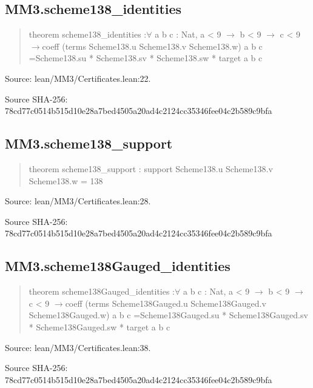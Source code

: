 \documentclass[11pt,a4paper]{article}
\begin{document}
\begin{samepage}
\subsection{MM3.scheme138\_identities}
\begin{quote}\small\ttfamily theorem scheme138\_identities :\newline     \ensuremath{\forall} a b c : Nat, a < 9 \ensuremath{\to} b < 9 \ensuremath{\to} c < 9 \ensuremath{\to}\newline       coeff (terms Scheme138.u Scheme138.v Scheme138.w) a b c =\newline         Scheme138.su * Scheme138.sv * Scheme138.sw * target a b c\end{quote}
{\small Source: lean/MM3/Certificates.lean:22.\par}

{\small Source SHA-256: 78cd77c0514b515d10e28a7bed4505a20ad4c2124cc35346fee04c2b589c9bfa\par}

\end{samepage}
\begin{samepage}
\subsection{MM3.scheme138\_support}
\begin{quote}\small\ttfamily theorem scheme138\_support : support Scheme138.u Scheme138.v Scheme138.w = 138\end{quote}
{\small Source: lean/MM3/Certificates.lean:28.\par}

{\small Source SHA-256: 78cd77c0514b515d10e28a7bed4505a20ad4c2124cc35346fee04c2b589c9bfa\par}

\end{samepage}
\begin{samepage}
\subsection{MM3.scheme138Gauged\_identities}
\begin{quote}\small\ttfamily theorem scheme138Gauged\_identities :\newline     \ensuremath{\forall} a b c : Nat, a < 9 \ensuremath{\to} b < 9 \ensuremath{\to} c < 9 \ensuremath{\to}\newline       coeff (terms Scheme138Gauged.u Scheme138Gauged.v Scheme138Gauged.w) a b c =\newline         Scheme138Gauged.su * Scheme138Gauged.sv * Scheme138Gauged.sw * target a b c\end{quote}
{\small Source: lean/MM3/Certificates.lean:38.\par}

{\small Source SHA-256: 78cd77c0514b515d10e28a7bed4505a20ad4c2124cc35346fee04c2b589c9bfa\par}

\end{samepage}
\end{document}
